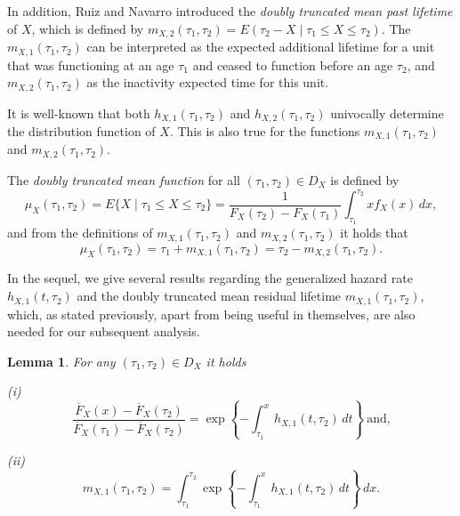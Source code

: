 \documentclass[11pt]{article}
\newtheorem{lemma}{Lemma}
\begin{document}
In addition, Ruiz and Navarro \cite{Ruiz1996} introduced the \textit{doubly truncated mean past lifetime} of $X$, which is defined by $m_{X,2}(\tau_1, \tau_2) = E(\tau_2 - X \mid \tau_1 \leq X \leq \tau_2)$. The $m_{X,1}(\tau_1, \tau_2)$ can be interpreted as the expected additional lifetime for a unit that was functioning at an age $\tau_1$ and ceased to function before an age $\tau_2$, and $m_{X,2}(\tau_1, \tau_2)$ as the inactivity expected time for this unit.  

It is well-known that both $h_{X,1}(\tau_1, \tau_2)$ and $h_{X,2}(\tau_1, \tau_2)$ univocally determine the distribution function of $X$. This is also true for the functions $m_{X,1}(\tau_1, \tau_2)$ and $m_{X,2}(\tau_1, \tau_2)$.  

The \textit{doubly truncated mean function} for all $(\tau_1, \tau_2) \in D_X$ is defined by 
\begin{equation*} \textstyle
	\mu_X(\tau_1, \tau_2) = E\{X \mid \tau_1 \leq X \leq \tau_2\} = \frac{1}{F_X(\tau_2) - F_X(\tau_1)} \int_{\tau_1}^{\tau_2} x f_X(x) \, dx,
\end{equation*}
and from the definitions of $m_{X,1}(\tau_1, \tau_2)$ and $m_{X,2}(\tau_1, \tau_2)$ it holds that
\begin{equation}
	\mu_X(\tau_1, \tau_2) = \tau_1 + m_{X,1}(\tau_1, \tau_2) = \tau_2 - m_{X,2}(\tau_1, \tau_2).
\end{equation}

In the sequel, we give several results regarding the generalized hazard rate $h_{X,1}(t, \tau_2)$ and the doubly truncated mean residual lifetime $m_{X,1}(\tau_1, \tau_2)$, which, as stated previously, apart from being useful in themselves, are also needed for our subsequent analysis.

 
\begin{lemma}
	For any $(\tau_1, \tau_2) \in D_X$ it holds
	
	\noindent (i) \begin{equation} \textstyle \frac{\overline{F}_X(x) - \overline{F}_X(\tau_2)}{\overline{F}_X(\tau_1) - \overline{F}_X(\tau_2)} = \exp\left\{ -\int_{\tau_1}^x h_{X,1}(t, \tau_2) \, dt \right\}  \ \text{and,} \end{equation}
	
	\noindent (ii) \begin{equation} \textstyle m_{X,1}(\tau_1, \tau_2) = \int_{\tau_1}^{\tau_2} \exp\left\{ -\int_{\tau_1}^x h_{X,1}(t, \tau_2) \, dt \right\} \, dx. \end{equation}
\end{lemma}
\end{document}
